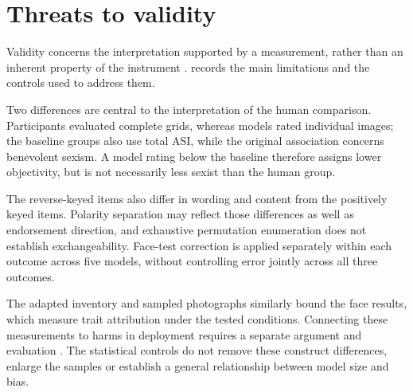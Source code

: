 \section{Threats to validity}\label{sec:disc-threats}

Validity concerns the interpretation supported by a measurement, rather than
an inherent property of the instrument \cite{messick1995validity}.
 records the main limitations and the controls used to
address them.

Two differences are central to the interpretation of the human comparison.
Participants evaluated complete grids, whereas models rated individual images;
the baseline groups also use total ASI, while the original association
concerns benevolent sexism. A model rating below the baseline therefore
assigns lower objectivity, but is not necessarily less sexist than the
human group.

The reverse-keyed items also differ in wording and content from the positively
keyed items. Polarity separation may reflect those differences as well as
endorsement direction, and exhaustive permutation enumeration does not
establish exchangeability. Face-test correction is applied separately within
each outcome across five models, without controlling error jointly across
all three outcomes.

The adapted inventory and sampled photographs similarly bound the face
results, which measure trait attribution under the tested conditions.
Connecting these measurements to harms in deployment requires a separate
argument and evaluation \cite{blodgett2020language}. The statistical controls
do not remove these construct differences, enlarge the samples or establish
a general relationship between model size and bias.

